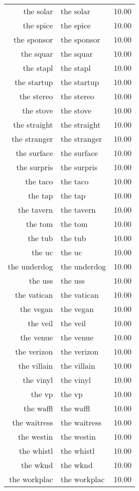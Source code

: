 \begin{table}[ht]
\begin{tabular}{rlr}
  the solar & the solar & 10.00 \\ 
  the spice & the spice & 10.00 \\ 
  the sponsor & the sponsor & 10.00 \\ 
  the squar & the squar & 10.00 \\ 
  the stapl & the stapl & 10.00 \\ 
  the startup & the startup & 10.00 \\ 
  the stereo & the stereo & 10.00 \\ 
  the stove & the stove & 10.00 \\ 
  the straight & the straight & 10.00 \\ 
  the stranger & the stranger & 10.00 \\ 
  the surface & the surface & 10.00 \\ 
  the surpris & the surpris & 10.00 \\ 
  the taco & the taco & 10.00 \\ 
  the tap & the tap & 10.00 \\ 
  the tavern & the tavern & 10.00 \\ 
  the tom & the tom & 10.00 \\ 
  the tub & the tub & 10.00 \\ 
  the uc & the uc & 10.00 \\ 
  the underdog & the underdog & 10.00 \\ 
  the uss & the uss & 10.00 \\ 
  the vatican & the vatican & 10.00 \\ 
  the vegan & the vegan & 10.00 \\ 
  the veil & the veil & 10.00 \\ 
  the venue & the venue & 10.00 \\ 
  the verizon & the verizon & 10.00 \\ 
  the villain & the villain & 10.00 \\ 
  the vinyl & the vinyl & 10.00 \\ 
  the vp & the vp & 10.00 \\ 
  the waffl & the waffl & 10.00 \\ 
  the waitress & the waitress & 10.00 \\ 
  the westin & the westin & 10.00 \\ 
  the whistl & the whistl & 10.00 \\ 
  the wknd & the wknd & 10.00 \\ 
  the workplac & the workplac & 10.00 \\ 

\end{tabular}
\end{table}
